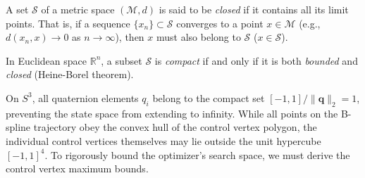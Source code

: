 \begin{dfn}[Closed]
    A set $\mathcal{S}$ of a metric space $(\mathcal{M}, d)$ is said to be \emph{closed} if it contains all its limit points.
    That is, if a sequence $\{x_n\} \subset \mathcal{S}$ converges to a point $x \in \mathcal{M}$ (e.g., $d(x_n, x) \to 0$ as $n \to \infty$), then $x$ must also belong to $\mathcal{S}$ ($x \in \mathcal{S}$).
\end{dfn}

\begin{dfn}[Compact]
    In Euclidean space $\mathbb{R}^n$, a subset $\mathcal{S}$ is \emph{compact} if and only if it is both \emph{bounded} and \emph{closed} (Heine-Borel theorem).
\end{dfn}
On $S^3$, all quaternion elements $q_i$ belong to the compact set $[-1,1] / \lVert \mathbf{q} \rVert_2 = 1$, preventing the state space from extending to infinity.
While all points on the B-spline trajectory obey the convex hull of the control vertex polygon, the individual control vertices themselves may lie outside the unit hypercube $[-1,1]^4$.
To rigorously bound the optimizer's search space, we must derive the control vertex maximum bounds.

